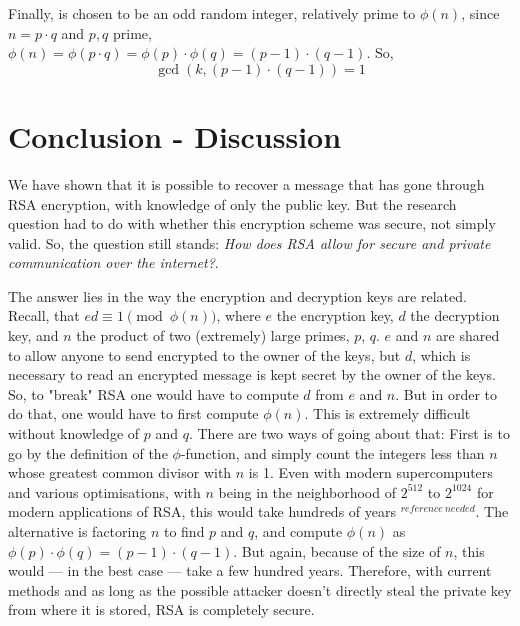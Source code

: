 \documentclass[12pt, titlepage]{article}
\let\oldsection\section
\renewcommand\section{\clearpage\oldsection}
\begin{document}
Finally,  is chosen to be an odd random integer, relatively prime to $\phi(n)$,
since $n=p \cdot q$ and $p,q$ prime, $\phi(n) = \phi(p \cdot q) = \phi(p) \cdot \phi(q) =
(p-1) \cdot (q-1)$. So, 
%
\begin{equation*}
    \gcd(k, (p-1) \cdot (q-1)) = 1
\end{equation*}
%

\section{Conclusion - Discussion}

We have shown that it is possible to recover a message that has gone through RSA encryption,
with knowledge of only the public key. But the research question had to do with whether this
encryption scheme was secure, not simply valid. So, the question still stands: \emph{How
does RSA allow for secure and private communication over the internet?}. 

The answer lies in the way the encryption and decryption keys are related. Recall, that
$ed\equiv 1 \pmod{\phi(n)}$, where $e$ the encryption key, $d$ the decryption key, and $n$
the product of two (extremely) large primes, $p$, $q$. $e$ and $n$ are shared to allow
anyone to send encrypted to the owner of the keys, but $d$, which is necessary to read an
encrypted message is kept secret by the owner of the keys. So, to "break" RSA one would have
to compute $d$ from $e$ and $n$. But in order to do that, one would have to first compute
$\phi(n)$. This is extremely difficult without knowledge of $p$ and $q$. There are two ways
of going about that: First is to go by the definition of the $\phi$-function, and simply
count the integers less than $n$ whose greatest common divisor with $n$ is 1. Even with
modern supercomputers and various optimisations, with $n$ being in the neighborhood of
$2^{512}$ to $2^{1024}$ for modern applications of RSA, this would take hundreds of years
$^{reference\ needed}$.  The alternative is factoring $n$ to find $p$ and $q$, and compute
$\phi(n)$ as $\phi(p) \cdot \phi(q) = (p-1) \cdot (q-1)$. But again, because of the size of
$n$, this would --- in the best case --- take a few hundred years. Therefore, with current
methods and as long as the possible attacker doesn't directly steal the private key from
where it is stored, RSA is completely secure.
\end{document}
